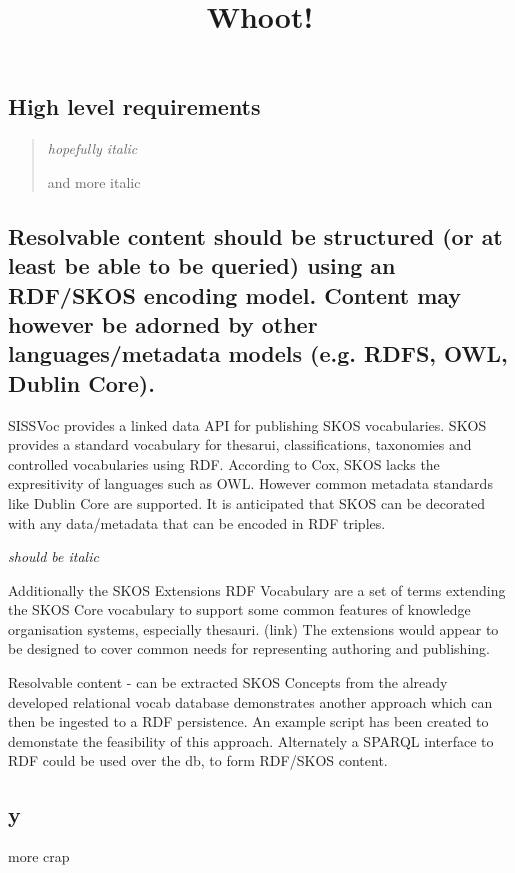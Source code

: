 \documentclass[10pt,a4paper]{article}
\title{Whoot!}
\date{}
\newenvironment{italicquotes}
{\begin{quote}\itshape}
{\end{quote}}
\begin{document}
  \maketitle
    \begin{flushleft}
  \setlength{\parindent}{5ex}



\section{High level requirements}

\begin{italicquotes} hopefully italic 

  and more italic
  \end{italicquotes} 


\subsection{Resolvable content should be structured (or at least be able to be queried)
  using an RDF/SKOS encoding model. Content may however be adorned by other
  languages/metadata models (e.g. RDFS, OWL, Dublin Core).  }


	SISSVoc provides a linked data API for publishing SKOS vocabularies.
  SKOS provides a standard vocabulary for thesarui, classifications, taxonomies
  and controlled vocabularies using RDF.
   According to Cox, SKOS lacks the expresitivity of languages such as OWL.
  However common metadata standards like Dublin Core are supported.
    It is anticipated that SKOS can be decorated with any data/metadata that can
  be encoded in RDF triples.

  \textit{should be italic}

	Additionally the SKOS Extensions RDF Vocabulary are a set of terms extending
	the SKOS Core vocabulary to support some common features of knowledge
	organisation systems, especially thesauri. (link) The extensions would appear
	to be designed to cover common needs for representing authoring and publishing.

	Resolvable content - can be extracted SKOS Concepts from the already developed
	relational vocab database demonstrates another approach which can then be
	ingested to a RDF persistence. An example script has been created to demonstate
	the feasibility of this approach. Alternately a SPARQL interface to RDF could
	be used over the db, to form RDF/SKOS content.


\subsection{y}
  more crap



\end{flushleft}
\end{document}
